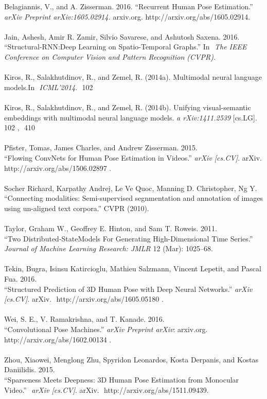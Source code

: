 \documentclass[a4paper, 12pt]{article}
\newcommand\tab[1][1cm]{\hspace*{#1}}
\begin{document}
Belagiannis, V., and A. Zisserman. 2016. “Recurrent Human Pose Estimation.”
\\ \tab \textit{arXiv Preprint arXiv:1605.02914.} arxiv.org. ​ http://arxiv.org/abs/1605.02914.
\\ \\
Jain, Ashesh, Amir R. Zamir, Silvio Savarese, and Ashutosh Saxena. 2016.
\\ \tab
“Structural-RNN:Deep Learning on Spatio-Temporal Graphs.” In ​ \textit{The IEEE Conference on Computer
Vision and Pattern Recognition (CVPR)}.
\\ \\
Kiros, R., Salakhutdinov, R., and Zemel, R. (2014a). Multimodal neural language models.In ​ \textit{ICML’2014}. ​ 102
\\ \\
Kiros, R., Salakhutdinov, R., and Zemel, R. (2014b). Unifying visual-semantic embeddings with multimodal neural language models. \textit{a
rXiv:1411.2539} [cs.LG]. 102​ , ​ 410
\\ \\
Pfister, Tomas, James Charles, and Andrew Zisserman. 2015. \\
\tab “Flowing ConvNets for Human Pose Estimation in Videos.” \textit{arXiv [cs.CV]}. arXiv. http://arxiv.org/abs/1506.02897​ .
\\ \\
Socher Richard, Karpathy Andrej, Le Ve Quoc, Manning D. Christopher, Ng Y.
\\ \tab “Connecting modalities: Semi-supervised segnmentation and annotation of images using un-aligned text corpora.” CVPR (2010).
\\ \\
Taylor, Graham W., Geoffrey E. Hinton, and Sam T. Roweis. 2011.
\\ \tab “Two Distributed-StateModels For Generating High-Dimensional Time Series.” \textit{Journal of Machine Learning Research: JMLR} 12 (Mar): 1025–68.
\\ \\
Tekin, Bugra, Isinsu Katircioglu, Mathieu Salzmann, Vincent Lepetit, and Pascal Fua. 2016.
\\ \tab
“Structured Prediction of 3D Human Pose with Deep Neural Networks.” ​\textit{ arXiv [cs.CV]}. arXiv. ​ http://arxiv.org/abs/1605.05180​ .
\\ \\
Wei, S. E., V. Ramakrishna, and T. Kanade. 2016. \\ \tab “Convolutional Pose Machines.” \textit{ arXiv Preprint arXiv}: arxiv.org. http://arxiv.org/abs/1602.00134​ .
\\ \\
Zhou, Xiaowei, Menglong Zhu, Spyridon Leonardos, Kosta Derpanis, and Kostas Daniilidis. 2015.
\\
\tab “Sparseness Meets Deepness: 3D Human Pose Estimation from Monocular
Video.” ​ \textit{arXiv [cs.CV]}. arXiv. ​ http://arxiv.org/abs/1511.09439​ .
\end{document}
